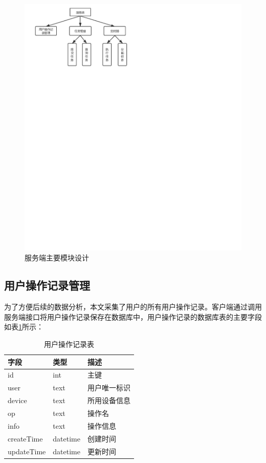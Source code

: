 \begin{figure}[ht]
    \centering
    \includegraphics[width=15cm]{images/server.pdf}
    \caption{服务端主要模块设计}
    \label{fig:server}
\end{figure}


\subsection{用户操作记录管理}
为了方便后续的数据分析，本文采集了用户的所有用户操作记录。客户端通过调用服务端接口将用户操作记录保存在数据库中，用户操作记录的数据库表的主要字段如表\ref{tab:op_log}所示：

\begin{table}[]
    \centering
    \caption{用户操作记录表}
    \begin{tabular}{lll}
        \toprule
        字段 & 类型 & 描述 \\ 
        \midrule
        id & int & 主键 \\
        user & text & 用户唯一标识 \\ 
        device & text & 所用设备信息 \\
        op & text & 操作名 \\
        info & text & 操作信息 \\
        createTime & datetime & 创建时间 \\
        updateTime & datetime & 更新时间\\
        \bottomrule
    \end{tabular}
    \label{tab:op_log}
\end{table}


